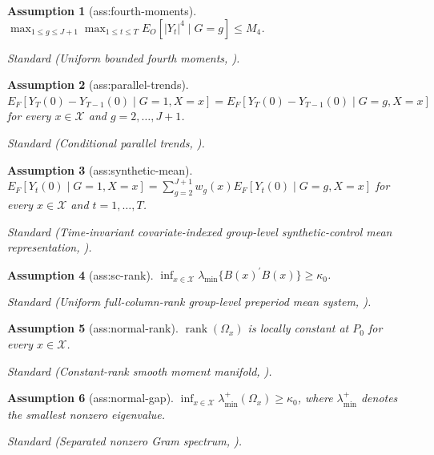 \documentclass{article}
\newtheorem{assumption}{Assumption}
\begin{document}
\begin{assumption}[ass:fourth-moments]\label{ass:fourth-moments}
\(\max_{1\le g\le J+1}\max_{1\le t\le T}E_O[|Y_t|^4\mid G=g]\le M_4\).
\par\smallskip\noindent\emph{Standard} (Uniform bounded fourth moments, \cite{SunXieZhang2025}).
\end{assumption}

\begin{assumption}[ass:parallel-trends]\label{ass:parallel-trends}
\(E_F[Y_T(0)-Y_{T-1}(0)\mid G=1,X=x]=E_F[Y_T(0)-Y_{T-1}(0)\mid G=g,X=x]\) for every \(x\in\mathcal X\) and \(g=2,\ldots,J+1\).
\par\smallskip\noindent\emph{Standard} (Conditional parallel trends, \cite{SunXieZhang2025}).
\end{assumption}

\begin{assumption}[ass:synthetic-mean]\label{ass:synthetic-mean}
\(E_F[Y_t(0)\mid G=1,X=x]=\sum_{g=2}^{J+1}w_g(x)E_F[Y_t(0)\mid G=g,X=x]\) for every \(x\in\mathcal X\) and \(t=1,\ldots,T\).
\par\smallskip\noindent\emph{Standard} (Time-invariant covariate-indexed group-level synthetic-control mean representation, \cite{SunXieZhang2025}).
\end{assumption}

\begin{assumption}[ass:sc-rank]\label{ass:sc-rank}
\(\inf_{x\in\mathcal X}\lambda_{\min}\{B(x)^{\prime}B(x)\}\ge\kappa_0\).
\par\smallskip\noindent\emph{Standard} (Uniform full-column-rank group-level preperiod mean system, \cite{SunXieZhang2025}).
\end{assumption}

\begin{assumption}[ass:normal-rank]\label{ass:normal-rank}
\(\operatorname{rank}(\Omega_x)\) is locally constant at \(P_0\) for every \(x\in\mathcal X\).
\par\smallskip\noindent\emph{Standard} (Constant-rank smooth moment manifold, \cite{Newey1994}).
\end{assumption}

\begin{assumption}[ass:normal-gap]\label{ass:normal-gap}
\(\inf_{x\in\mathcal X}\lambda_{\min}^{+}(\Omega_x)\ge\kappa_0\), where \(\lambda_{\min}^{+}\) denotes the smallest nonzero eigenvalue.
\par\smallskip\noindent\emph{Standard} (Separated nonzero Gram spectrum, \cite{AndrewsCheng2012}).
\end{assumption}
\end{document}
